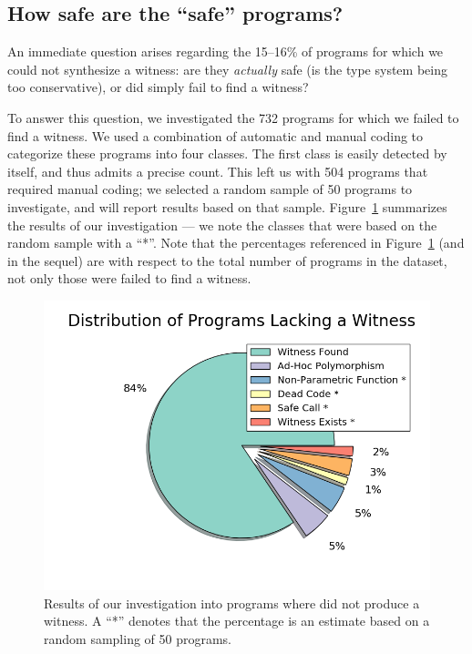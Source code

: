 \subsection{How safe are the ``safe'' programs?}
\label{sec:how-safe}

An immediate question arises regarding the 15--16\% of programs for
which we could not synthesize a witness:
%
are they \emph{actually} safe (\ie is the type system being too conservative),
%
or did \toolname simply fail to find a witness?
%

To answer this question, we investigated the 732 \ucsdbench programs for
which we failed to find a witness.
%
We used a combination of automatic and manual coding to categorize these
programs into four classes.
%
The first class is easily detected by \toolname itself, and thus admits
a precise count.
%
This left us with 504 programs that required manual coding; we selected
a random sample of 50 programs to investigate, and will report results
based on that sample.
%
Figure~\ref{fig:no-witness} summarizes the results of our investigation ---
we note the classes that were based on the random sample with a ``*''.
%
Note that the percentages referenced in Figure~\ref{fig:no-witness} (and
in the sequel) are with respect to the total number of programs in the
\ucsdbench dataset, not only those were \toolname failed to find a
witness.

\begin{figure}[t]
\includegraphics[width=0.7\linewidth]{distrib_ext.png}
\vspace{-0.75cm}
\caption{Results of our investigation into programs where \toolname
  did not produce a witness. A ``*'' denotes that the percentage is an
  estimate based on a random sampling of 50 programs.}
\label{fig:no-witness}
\end{figure}

